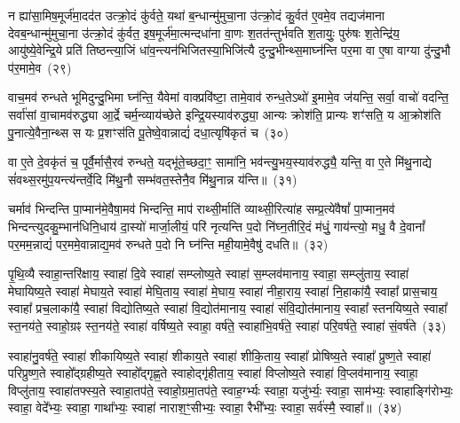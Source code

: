{%
न ह्या॑सा॒मिष॒मूर्ज॑मा॒दद॑त उत्क्रो॒दं कु॑र्वते॒ यथा॑ ब॒न्धान्मु॑मुचा॒ना उ॑त्क्रो॒दं कु॒र्वत॑ ए॒वमे॒व तद्यज॑माना देवब॒न्धान्मु॑मुचा॒ना उ॑त्क्रो॒दं कु॑र्वत॒ इष॒मूर्ज॑मा॒त्मन्दधा॑ना वा॒णः श॒तत॑न्तुर्भवति श॒तायुः॒ पुरु॑षः श॒तेन्द्रि॑य॒ आयु॑ष्ये॒वेन्द्रि॒ये प्रति॑ तिष्ठन्त्या॒जिं धा॑व॒न्त्यन॑भिजितस्या॒भिजि॑त्यै दुन्दु॒भीन्थ्स॒माघ्न॑न्ति पर॒मा वा ए॒षा वाग्या दु॑न्दु॒भौ प॑र॒मामे॒व~(२९)

वाच॒मव॑ रुन्धते भूमिदुन्दु॒भिमा घ्न॑न्ति॒ यैवेमां वाक्प्रवि॑ष्टा॒ तामे॒वाव॑ रुन्ध॒ते\-ऽथो॑ इ॒मामे॒व ज॑यन्ति॒ सर्वा॒ वाचो॑ वदन्ति॒ सर्वा॑सां वा॒चामव॑रुद्ध्या आ॒र्द्रे चर्म॒न्व्याय॑च्छेते इन्द्रि॒यस्याव॑रुद्ध्या॒ आन्यः क्रोश॑ति॒ प्रान्यः शꣳ॑सति॒ य आ॒क्रोश॑ति पु॒नात्ये॒वैना॒न्थ्स स यः प्र॒शꣳस॑ति पू॒तेष्वे॒वान्नाद्यं॑ दधा॒त्यृषि॑कृतं च~(३०)

वा ए॒ते दे॒वकृ॑तं च॒ पूर्वै॒र्मासै॒रव॑ रुन्धते॒ यद्भू॑ते॒च्छदा॒ꣳ॒ सामा॑नि॒ भव॑न्त्यु॒भय॒स्याव॑रुद्ध्यै॒ यन्ति॒ वा ए॒ते मि॑थु॒नाद्ये सं॑वथ्स॒रमु॑प॒यन्त्य॑न्तर्वे॒दि मि॑थु॒नौ सम्भ॑वत॒स्तेनै॒व मि॑थु॒नान्न य॑न्ति॥~(३१)

{\anuvakamend[{व्यृ॑द्ध॒मक्षो॑धुका॒स्ताꣳ समां᳚ प्र॒जाः प॑र॒मामे॒व च॑ त्रि॒ꣳ॒शच्च॑}]}%

चर्माव॑ भिन्दन्ति पा॒प्मान॑मे॒वैषा॒मव॑ भिन्दन्ति॒ माप॑ राथ्सी॒र्माति॑ व्याथ्सी॒रित्या॑ह सम्प्र॒त्ये॑वैषां᳚ पा॒प्मान॒मव॑ भिन्दन्त्युदकु॒म्भान॑धिनि॒धाय॑ दा॒स्यो॑ मार्जा॒लीयं॒ परि॑ नृत्यन्ति प॒दो नि॑घ्न॒तीरि॒दं म॑धुं॒ गाय॑न्त्यो॒ मधु॒ वै दे॒वानां᳚ पर॒मम॒न्नाद्यं॑ पर॒ममे॒वान्नाद्य॒मव॑ रुन्धते प॒दो नि घ्न॑न्ति मही॒यामे॒वैषु॑ दधति॥~(३२)

{\anuvakamend[{चर्मैका॒न्नप॑ञ्चा॒शत्}]}%

पृ॒थि॒व्यै स्वाहा॒न्तरि॑क्षाय॒ स्वाहा॑ दि॒वे स्वाहा॑ सम्प्लोष्य॒ते स्वाहा॑ स॒म्प्लव॑मानाय॒ स्वाहा॒ सम्प्लु॑ताय॒ स्वाहा॑ मेघायिष्य॒ते स्वाहा॑ मेघाय॒ते स्वाहा॑ मेघि॒ताय॒ स्वाहा॑ मे॒घाय॒ स्वाहा॑ नीहा॒राय॒ स्वाहा॑ नि॒हाका॑यै॒ स्वाहा᳚ प्रास॒चाय॒ स्वाहा᳚ प्रच॒लाका॑यै॒ स्वाहा॑ विद्योतिष्य॒ते स्वाहा॑ वि॒द्योत॑मानाय॒ स्वाहा॑ संवि॒द्योत॑मानाय॒ स्वाहा᳚ स्तनयिष्य॒ते स्वाहा᳚ स्त॒नय॑ते॒ स्वाहो॒ग्रꣴ स्त॒नय॑ते॒ स्वाहा॑ वर्\mbox{}षिष्य॒ते स्वाहा॒ वर्\mbox{}ष॑ते॒ स्वाहा॑भि॒वर्\mbox{}ष॑ते॒ स्वाहा॑ परि॒वर्\mbox{}ष॑ते॒ स्वाहा॑ सं॒वर्\mbox{}ष॑ते~(३३)

स्वाहा॑नु॒वर्\mbox{}ष॑ते॒ स्वाहा॑ शीकायिष्य॒ते स्वाहा॑ शीकाय॒ते स्वाहा॑ शीकि॒ताय॒ स्वाहा᳚ प्रोषिष्य॒ते स्वाहा᳚ प्रुष्ण॒ते स्वाहा॑ परिप्रुष्ण॒ते स्वाहो᳚द्ग्रहीष्य॒ते स्वाहो᳚द्गृह्ण॒ते स्वाहोद्गृ॑हीताय॒ स्वाहा॑ विप्लोष्य॒ते स्वाहा॑ वि॒प्लव॑मानाय॒ स्वाहा॒ विप्लु॑ताय॒ स्वाहा॑तफ्स्य॒ते स्वाहा॒तप॑ते॒ स्वाहो॒ग्रमा॒तप॑ते॒ स्वाह॒र्ग्भ्यः स्वाहा॒ यजु॑र्भ्यः॒ स्वाहा॒ साम॑भ्यः॒ स्वाहाङ्गि॑रोभ्यः॒ स्वाहा॒ वेदे᳚भ्यः॒ स्वाहा॒ गाथा᳚भ्यः॒ स्वाहा॑ नाराश॒ꣳ॒सीभ्यः॒ स्वाहा॒ रैभी᳚भ्यः॒ स्वाहा॒ सर्व॑स्मै॒ स्वाहा᳚॥~(३४)

}
